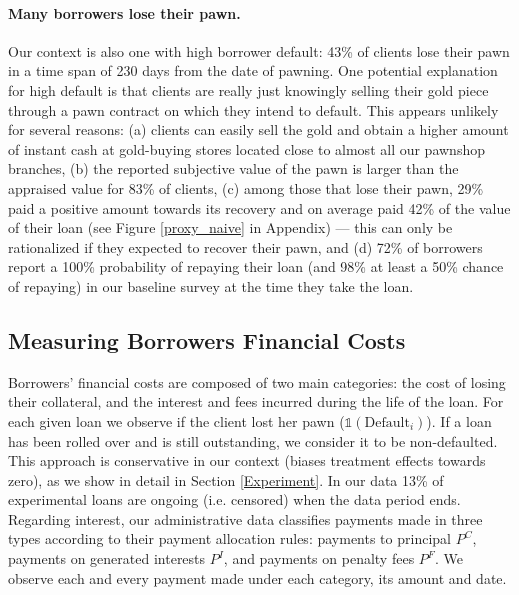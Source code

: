 \documentclass[12pt, a4paper]{article}
\begin{document}
\paragraph*{Many borrowers lose their pawn.}
Our context is also one with high borrower default: 43\% of clients lose their pawn in a time span of 230 days from the date of pawning. One potential explanation for high default is that clients are really just knowingly selling their gold piece through a pawn contract on which they intend to default. This appears unlikely for several reasons: (a) clients can easily sell the gold and obtain a higher amount of instant cash at gold-buying stores located close to almost all our pawnshop branches,
(b) the reported subjective value of the pawn is larger than the appraised value for 83\% of clients, (c) among those that lose their pawn, 29\% paid a positive amount towards its recovery and on average paid 42\% of the value of their loan (see Figure \ref{proxy_naive} in Appendix) --- this can only be rationalized if they expected to recover their pawn, and (d) 72\% of borrowers report a 100\% probability of repaying their loan (and 98\% at least a 50\% chance of repaying) in our baseline survey at the time they take the loan.  %

    
\subsection{Measuring Borrowers Financial Costs} 
\label{costs}
    
Borrowers' financial costs are composed of two main categories: the cost of losing their collateral, and the interest and fees incurred during the life of the loan. For each given loan we observe if the client lost her pawn ($\mathds{1}(\text{Default}_i)$). If a loan has been rolled over and is still outstanding, we consider it to be non-defaulted.  This approach is conservative in our context (biases treatment effects towards zero), as we show in detail in Section \ref{Experiment}. In our data 13\% of experimental loans are ongoing (i.e. censored) when the data period ends. Regarding interest, our administrative data classifies payments made in three types according to their payment allocation rules: payments to principal $P^C$, payments on generated interests $P^I$, and payments on penalty fees $P^F$. We observe each and every payment made under each category, its amount and date. 
\end{document}
